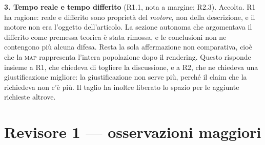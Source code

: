 \documentclass[11pt,a4paper]{article}
\begin{document}
\textbf{3. Tempo reale e tempo differito} (R1.1, nota a margine; R2.3).
Accolta. R1 ha ragione: reale e differito sono proprietà del \emph{motore},
non della descrizione, e il motore non era l'oggetto dell'articolo. La
sezione autonoma che argomentava il differito come premessa teorica è stata
rimossa, e le conclusioni non ne contengono più alcuna difesa. Resta la sola
affermazione non comparativa, cioè che la \textsc{map} rappresenta l'intera
popolazione dopo il rendering. Questo risponde insieme a R1, che chiedeva di
togliere la discussione, e a R2, che ne chiedeva una giustificazione
migliore: la giustificazione non serve più, perché il claim che la
richiedeva non c'è più. Il taglio ha inoltre liberato lo spazio per le
aggiunte richieste altrove.

\section*{Revisore 1 --- osservazioni maggiori}
\end{document}
